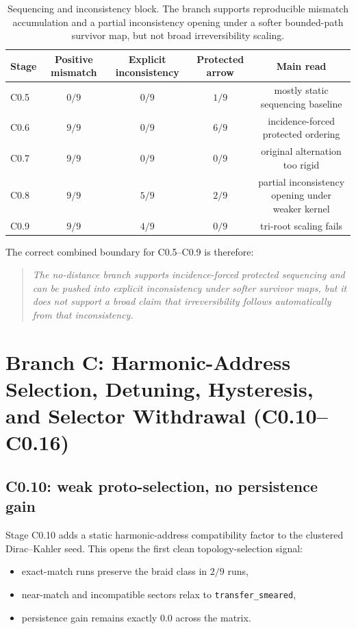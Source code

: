 \documentclass[11pt]{article}
\begin{document}
\begin{table}[t]
\centering
\scriptsize
\begin{tabular}{@{}lcccc@{}}
\toprule
Stage & Positive mismatch & Explicit inconsistency & Protected arrow & Main read \\
\midrule
C0.5 & $0/9$ & $0/9$ & $1/9$ & mostly static sequencing baseline \\
C0.6 & $9/9$ & $0/9$ & $6/9$ & incidence-forced protected ordering \\
C0.7 & $9/9$ & $0/9$ & $0/9$ & original alternation too rigid \\
C0.8 & $9/9$ & $5/9$ & $2/9$ & partial inconsistency opening under weaker kernel \\
C0.9 & $9/9$ & $4/9$ & $0/9$ & tri-root scaling fails \\
\bottomrule
\end{tabular}
\caption{Sequencing and inconsistency block. The branch supports reproducible mismatch accumulation and a partial inconsistency opening under a softer bounded-path survivor map, but not broad irreversibility scaling.}
\label{tab:c0b}
\end{table}

The correct combined boundary for C0.5--C0.9 is therefore:
\begin{quote}
\emph{The no-distance branch supports incidence-forced protected sequencing and can be pushed into explicit inconsistency under softer survivor maps, but it does not support a broad claim that irreversibility follows automatically from that inconsistency.}
\end{quote}

\section{Branch C: Harmonic-Address Selection, Detuning, Hysteresis, and Selector Withdrawal (C0.10--C0.16)}

\subsection{C0.10: weak proto-selection, no persistence gain}

Stage C0.10 adds a static harmonic-address compatibility factor to the clustered Dirac--Kahler seed. This opens the first clean topology-selection signal:
\begin{itemize}
\item exact-match runs preserve the braid class in $2/9$ runs,
\item near-match and incompatible sectors relax to \texttt{transfer\_smeared},
\item persistence gain remains exactly $0.0$ across the matrix.
\end{itemize}
\end{document}
